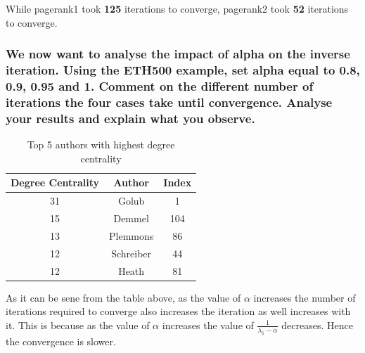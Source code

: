 \documentclass[unicode,11pt,a4paper,oneside,numbers=endperiod,openany]{scrartcl}
\begin{document}
While pagerank1 took \textbf{125} iterations to converge, pagerank2 took \textbf{52} iterations to converge.\\

\subsubsection{We now want to analyse the impact of alpha on the inverse iteration. Using the ETH500 example, set alpha equal to 0.8, 0.9, 0.95 and 1. Comment on the different number of iterations the four cases take until convergence. Analyse your results and explain what you observe.}




\noindent
\begin{table}[H]
    \centering
    \begin{tabular}{|c|c|c|}
        \hline
        Degree Centrality & Author    & Index \\
        \hline
        31                & Golub     & 1     \\
        \hline
        15                & Demmel    & 104   \\
        \hline
        13                & Plemmons  & 86    \\
        \hline
        12                & Schreiber & 44    \\
        \hline
        12                & Heath     & 81    \\
        \hline
    \end{tabular}
    \caption{Top 5 authors with highest degree centrality}
\end{table}

As it can be sene from the table above, as the value of $\alpha$ increases the number of iterations required to converge also increases the iteration as well increases with it. This is because as the value of $\alpha$ increases the value of $ \frac{1}{\lambda_1 - \alpha} $ decreases. Hence the convergence is slower. \\
\end{document}
